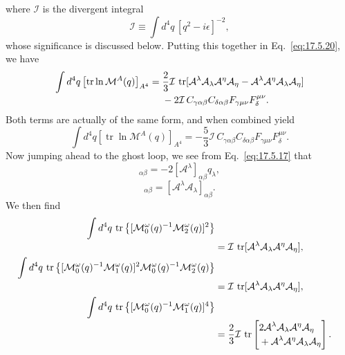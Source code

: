 where $\mathcal I$ is the divergent integral
\begin{equation}
\mathcal I\equiv\int d^4q\,[q^2-i\epsilon]^{-2},
\label{eq:17.5.24}
\end{equation}
whose significance is discussed below. Putting this together in
Eq.~\eqref{eq:17.5.20}, we have
\begin{align*}
\int d^4q\left[\operatorname{tr}\ln\mathcal M^A(q)\right]_{A^4}
={}&\frac23\mathcal I\,\operatorname{tr}
[\mathcal A^\lambda\mathcal A_\lambda\mathcal A^\eta\mathcal A_\eta
-\mathcal A^\lambda\mathcal A^\eta\mathcal A_\lambda\mathcal A_\eta]
\notag\\[-2pt]
&-2\mathcal I\,C_{\gamma\alpha\beta}C_{\delta\alpha\beta}
F_{\gamma\mu\nu}F_\delta^{\mu\nu}.
\end{align*}
Both terms are actually of the same form, and when combined yield
\begin{equation}
\int d^4q\left[\operatorname{tr}\ln\mathcal M^A(q)\right]_{A^4}
=-\frac53\mathcal I\,C_{\gamma\alpha\beta}C_{\delta\alpha\beta}
F_{\gamma\mu\nu}F_\delta^{\mu\nu}.
\label{eq:17.5.25}
\end{equation}
Now jumping ahead to the ghost loop, we see from Eq.~\eqref{eq:17.5.17} that
\begin{equation}
[\mathcal M_1^\omega(q)]_{\alpha\beta}
=-2[\mathcal A^\lambda]_{\alpha\beta}q_\lambda,
\label{eq:17.5.26}
\end{equation}
\begin{equation}
[\mathcal M_2^\omega(q)]_{\alpha\beta}
=[\mathcal A^\lambda\mathcal A_\lambda]_{\alpha\beta}.
\label{eq:17.5.27}
\end{equation}
We then find
\begin{align*}
\int d^4q\,\operatorname{tr}\left\{
[\mathcal M_0^\omega(q)^{-1}\mathcal M_2^\omega(q)]^2\right\}
\notag\\[-2pt]
&=\mathcal I\,\operatorname{tr}
[\mathcal A^\lambda\mathcal A_\lambda\mathcal A^\eta\mathcal A_\eta],\\
\int d^4q\,\operatorname{tr}\left\{
[\mathcal M_0^\omega(q)^{-1}\mathcal M_1^\omega(q)]^2
\mathcal M_0^\omega(q)^{-1}\mathcal M_2^\omega(q)\right\}
\notag\\[-2pt]
&=\mathcal I\,\operatorname{tr}
[\mathcal A^\lambda\mathcal A_\lambda\mathcal A^\eta\mathcal A_\eta],\\
\int d^4q\,\operatorname{tr}\left\{
[\mathcal M_0^\omega(q)^{-1}\mathcal M_1^\omega(q)]^4\right\}
\notag\\[-2pt]
&=\frac23\mathcal I\,\operatorname{tr}
\left[\begin{aligned}
&2\mathcal A^\lambda\mathcal A_\lambda\mathcal A^\eta\mathcal A_\eta\\[-2pt]
&+\mathcal A^\lambda\mathcal A^\eta\mathcal A_\lambda\mathcal A_\eta
\end{aligned}\right].
\end{align*}
